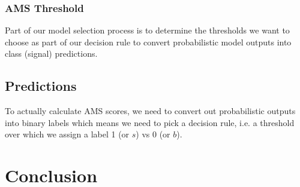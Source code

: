 \subsubsection{AMS Threshold}
Part of our model selection process is to determine the thresholds we want to choose as part of our decision rule to convert probabilistic model outputs into class (signal) predictions. 


\label{table:1}

\subsection{Predictions}
To actually calculate AMS scores, we need to convert out probabilistic outputs into binary labels which means we need to pick a decision rule, i.e. a threshold over which we assign a label 1 (or $s$) vs 0 (or $b$).

\section{Conclusion}
\label{conclusion}

\pagebreak 


{}


